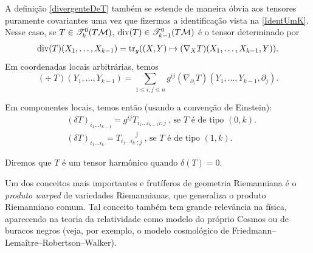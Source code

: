       \begin{oobs}
        A definição \cref{divergenteDeT} também se estende de maneira óbvia aos tensores puramente covariantes uma vez que fizermos a identificação vista na \cref{IdentUmK}. Nesse caso, se $T \in \mathscr{T}^0_k(T \mathcal{M})$, $\mathrm{div}(T) \in \mathscr{T}^{0}_{k-1}(T \mathcal{M})$ é o tensor determinado por
        \[ \begin{aligned}
        \mathrm{div}(T)(X_1, \ldots, X_{k-1}) &= \operatorname{tr}_g((X, Y) \mapsto (\nabla_X T)(X_1, \ldots, X_{k-1}, Y)). \\
        \end{aligned}
        \]
        Em coordenadas locais arbitrárias, temos
        \[
        (\div \ T)(Y_1, \ldots, Y_{k-1}) = \sum_{1 \leq i, j \leq n} g^{ij} (\nabla_{\partial_i} T)(Y_1, \ldots, Y_{k-1}, \partial_j) .
        \]
        \end{oobs}
        \begin{oobs}
        Em componentes locais, temos então (usando a convenção de Einstein):
        \[ \begin{aligned}
        &(\delta T)_{i_1 \ldots i_{k-1}} = g^{ij} T_{i_1 \ldots i_{k-1} i ; j} \ \text{, se $T$ é de tipo $(0, k)$.} \\
        &(\delta T)_{i_1 \ldots i_k} = T_{i_1 \ldots i_k}{}^{j}_{\ ;j} \ \text{, se $T$ é de tipo $(1, k)$.}
        \end{aligned}
        \]
        \end{oobs}
        \begin{deff}
        Diremos que $T$ é um tensor harmônico quando $\delta(T) = 0$.
        \end{deff}

        Um dos conceitos mais importantes e frutíferos de geometria Riemanniana é o \emph{produto warped} de variedades Riemannianas, que generaliza o produto Riemanniano comum. Tal conceito também tem grande relevância na física, aparecendo na teoria da relatividade como modelo do próprio Cosmos ou de buracos negros (veja, por exemplo, o modelo cosmológico de Friedmann–Lemaître–Robertson–Walker). 


